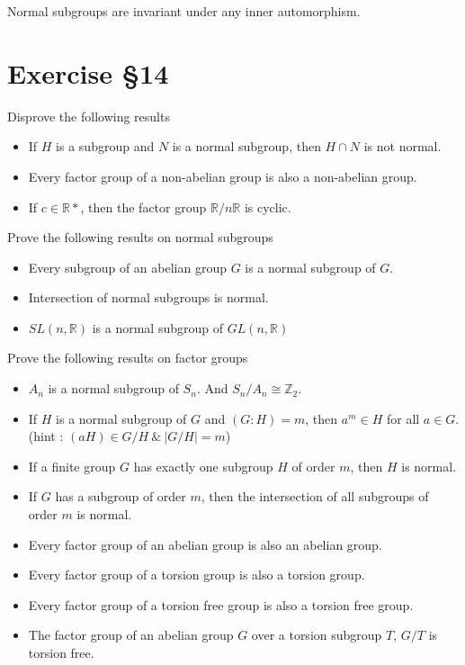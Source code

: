 \begin{remark}
	Normal subgroups are invariant under any inner automorphism.
\end{remark}
\pagebreak

\section{Exercise \S14}
\begin{remark} Disprove the following results
	\begin{itemize}
		\item If $H$ is a subgroup and $N$ is a normal subgroup, then $H \cap N$ is not normal. %
		\item Every factor group of a non-abelian group is also a non-abelian group.%
		\item If $c \in \mathbb{R}*$, then the factor group $\mathbb{R}/n\mathbb{R}$ is cyclic.
	\end{itemize}
\end{remark}
\begin{remark}Prove the following results on normal subgroups
	\begin{itemize}
		\item Every subgroup of an abelian group $G$ is a normal subgroup of $G$. %
		\item Intersection of normal subgroups is normal. %
		\item $SL(n,\mathbb{R})$ is a normal subgroup of $GL(n,\mathbb{R})$%
	\end{itemize}
\end{remark}

\begin{remark}Prove the following results on factor groups
	\begin{itemize}
		\item $A_n$ is a normal subgroup of $S_n$. And $S_n/A_n \cong \mathbb{Z}_2$.%
		\item If $H$ is a normal subgroup of $G$ and $(G:H) = m$, then $a^m \in H$ for all $a \in G$.%
			(hint : $(aH) \in G/H\ \&\ |G/H| = m$)
		\item If a finite group $G$ has exactly one subgroup $H$ of order $m$, then $H$ is normal. %
		\item If $G$ has a subgroup of order $m$, then the intersection of all subgroups of order $m$ is normal.%
		\item Every factor group of an abelian group is also an abelian group.%
		\item Every factor group of a torsion group is also a torsion group.%
		\item Every factor group of a torsion free group is also a torsion free group.%
		\item The factor group of an abelian group $G$ over a torsion subgroup $T$, $G/T$ is torsion free.%
	\end{itemize}
\end{remark}

